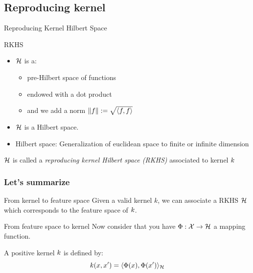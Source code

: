 \documentclass[11pt, pdf, compress, handout]{beamer}
\begin{document}
\subsection{Reproducing kernel}

\begin{frame}{Reproducing Kernel Hilbert Space}
  \begin{block}{RKHS}
    \begin{itemize}
    \item ${\mathcal{H}}$ is a:
      \begin{itemize}
      \item pre-Hilbert space of functions
      \item endowed with a dot product
      \item and we add a norm
        $\|{\mathnormal{f}} \| := \sqrt{\langle {\mathnormal{f}}, {\mathnormal{f}}\rangle}$
      \end{itemize}

      
    \item  ${\mathcal{H}}$ is a Hilbert space.
    
    \item Hilbert space: Generalization of euclidean space to finite or
      infinite dimension
    \end{itemize}
    \begin{center}
      \begin{tcolorbox} {\large ${\mathcal{H}}$ is called a \emph{reproducing
            kernel Hilbert space (RKHS)} associated to kernel ${\mathnormal{k}}$ }
      \end{tcolorbox}
    \end{center}\end{block}
\end{frame}

\begin{frame}
  \frametitle{Let's summarize}
  \begin{block}{From kernel to feature space}
    Given a valid kernel $k$, we can associate a RKHS ${\mathcal{H}}$ which
    corresponds to the feature space of ${\mathnormal{k}}$.
  \end{block}
  
  \begin{block}{From feature space to kernel}
    Now consider that you have $\Phi : {\mathcal{X}} \to {\mathcal{H}}$ a mapping function.

    A positive kernel ${\mathnormal{k}}$ is defined by:
    $$ {\mathnormal{k}}({\mathnormal{x}}, {\mathnormal{x}}') = \langle \Phi({\mathnormal{x}}), \Phi({\mathnormal{x}}') \rangle_{\mathcal{H}}$$
  \end{block}

\end{frame}
\end{document}
